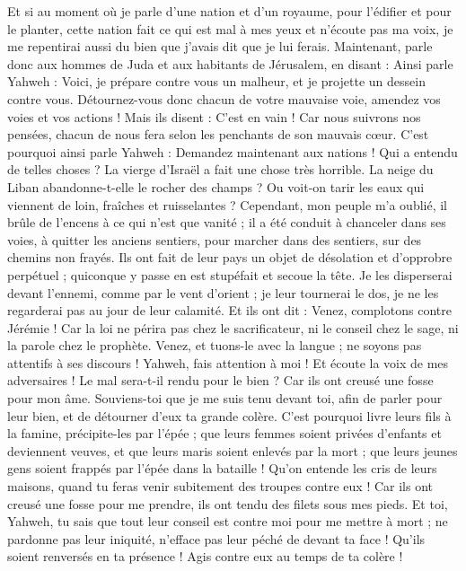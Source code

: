 \begin{multicols}{2}
Et si au moment où je parle d'une nation et d'un royaume, pour l'édifier et pour le planter,
cette nation fait ce qui est mal à mes yeux et n'écoute pas ma voix, je me repentirai aussi du bien que j'avais dit que je lui ferais.
Maintenant, parle donc aux hommes de Juda et aux habitants de Jérusalem, en disant : Ainsi parle Yahweh : Voici, je prépare contre vous un malheur, et je projette un dessein contre vous. Détournez-vous donc chacun de votre mauvaise voie, amendez vos voies et vos actions !
Mais ils disent : C’est en vain ! Car nous suivrons nos pensées, chacun de nous fera selon les penchants de son mauvais cœur.
C'est pourquoi ainsi parle Yahweh : Demandez maintenant aux nations ! Qui a entendu de telles choses ? La vierge d'Israël a fait une chose très horrible.
La neige du Liban abandonne-t-elle le rocher des champs ? Ou voit-on tarir les eaux qui viennent de loin, fraîches et ruisselantes ?
Cependant, mon peuple m'a oublié, il brûle de l’encens à ce qui n'est que vanité ; il a été conduit à chanceler dans ses voies, à quitter les anciens sentiers, pour marcher dans des sentiers, sur des chemins non frayés.
Ils ont fait de leur pays un objet de désolation et d’opprobre perpétuel ; quiconque y passe en est stupéfait et secoue la tête.
Je les disperserai devant l'ennemi, comme par le vent d'orient ; je leur tournerai le dos, je ne les regarderai pas au jour de leur calamité.
Et ils ont dit : Venez, complotons contre Jérémie ! Car la loi ne périra pas chez le sacrificateur, ni le conseil chez le sage, ni la parole chez le prophète. Venez, et tuons-le avec la langue ; ne soyons pas attentifs à ses discours !
Yahweh, fais attention à moi ! Et écoute la voix de mes adversaires !
Le mal sera-t-il rendu pour le bien ? Car ils ont creusé une fosse pour mon âme. Souviens-toi que je me suis tenu devant toi, afin de parler pour leur bien, et de détourner d'eux ta grande colère.
C'est pourquoi livre leurs fils à la famine, précipite-les par l'épée ; que leurs femmes soient privées d'enfants et deviennent veuves, et que leurs maris soient enlevés par la mort ; que leurs jeunes gens soient frappés par l'épée dans la bataille !
Qu’on entende les cris de leurs maisons, quand tu feras venir subitement des troupes contre eux ! Car ils ont creusé une fosse pour me prendre, ils ont tendu des filets sous mes pieds.
Et toi, Yahweh, tu sais que tout leur conseil est contre moi pour me mettre à mort ; ne pardonne pas leur iniquité, n'efface pas leur péché de devant ta face ! Qu’ils soient renversés en ta présence ! Agis contre eux au temps de ta colère !

\end{multicols}
